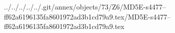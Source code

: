 ../../../../../.git/annex/objects/73/Z6/MD5E-s4477--ff62a6196135fa8601972ad3b1cd79a9.tex/MD5E-s4477--ff62a6196135fa8601972ad3b1cd79a9.tex